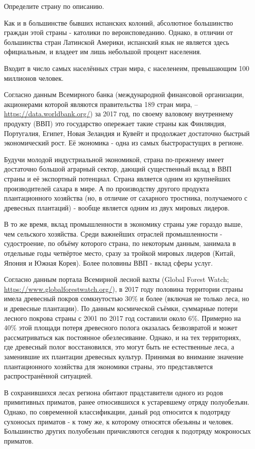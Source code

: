 
Определите страну по описанию.

Как и в большинстве бывших испанских колоний, абсолютное большинство граждан этой страны - католики по вероисповеданию. Однако, в отличии от большинства стран Латинской Америки, испанский язык не является здесь официальным, и владеет им лишь небольшой процент населения.

Входит в число самых населённых стран мира, с населенеим, превышающим 100 миллионов человек.

Согласно данным Всемирного банка (международной финансовой организации, акционерами которой являются правительства 189 стран мира, – \url{https://data.worldbank.org/}) за 2017 год, по своему валовому внутреннему продукту (ВВП) это государство опережает такие страны как Финляндия, Португалия, Египет, Новая Зеландия и Кувейт и продолжает достаточно быстрый экономический рост. Её экономика - одна из самых быстрорастущих в регионе.

Будучи молодой индустриальной экономикой, страна по-прежнему имеет достаточно большой аграрный сектор, дающий существенный вклад в ВВП страны и её экспортный потенциал. Страна является одним из крупнейших производителей сахара в мире. А по производству другого продукта плантационного хозяйства (но, в отличие от сахарного тростника, получаемого с древесных плантаций) - вообще является одним из двух мировых лидеров.

В то же время, вклад промышленности в экономику страны уже гораздо выше, чем сельского хозяйства. Среди важнейших отраслей промышленности - судостроение, по объёму которого страна, по некоторым данным, занимала в отдельные годы четвёртое место, сразу за тройкой мировых лидеров (Китай, Япония и Южная Корея). Более половины ВВП - вклад сферы услуг.

Согласно данным портала Всемирной лесной вахты (Global Forest Watch; \url{https://www.globalforestwatch.org/}), в 2017 году половина территории страны имела древесный покров сомкнутостью 30\% и более (включая не только леса, но и древесные плантации). По данным космической съёмки, суммарные потери лесного покрова страны с 2001 по 2017 год составили около 6\%. Примерно на 40\% этой площади потеря древесного полога оказалась безвозвратой и может рассматриваться как постоянное обезлесивание. Однако, и на тех территориях, где древесный полог восстановился, это могут быть не естественные леса, а заменившие их плантации древесных культур. Принимая во внимание значение плантационного хозяйства для экономики страны, это представляется распространённой ситуацией.

В сохранившихся лесах региона обитают прадставители одного из родов примитивных приматов, ранее относившихся к устаревшему отряду полуобезъян. Однако, по современной классификации, даный род относится к подотряду сухоносых приматов - к тому же, к которому относятся обезьяны и человек. Большинство других полуобезьян причисляются сегодня к подотряду мокроносых приматов.

